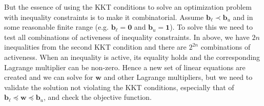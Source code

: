 \documentclass{beamer}
\begin{document}
\begin{frame}


\justifying
But the essence of using the KKT conditions to solve an optimization problem with inequality constraints is to make it combinatorial. Assume $\mathbf{b}_{\ell} \prec \mathbf{b}_{u}$ and in some reasonable finite range (e.g. $\mathbf{b}_{\ell} = \mathbf{0}$ and $\mathbf{b}_{u} = \mathbf{1}$). To solve this we need to test all combinations of activeness of inequality constraints. In above, we have $2n$ inequalities from the second KKT condition and there are $2^{2n}$ combinations of activeness. When an inequality is active, its equality holds and the corresponding Lagrange multiplier can be non-zero. Hence a new set of linear equations are created and we can solve for $\mathbf{w}$ and other Lagrange multipliers, but we need to validate the solution not violating the KKT conditions, especially that of $\mathbf{b}_{\ell} \preccurlyeq \mathbf{w} \preccurlyeq \mathbf{b}_{u}$, and check the objective function.

\end{frame}
\end{document}
